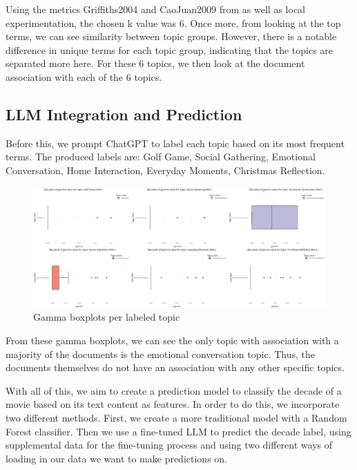 \documentclass[
  authoryear,
  preprint]{elsarticle}
\begin{document}
Using the metrics Griffiths2004 and CaoJuan2009 from \citet{ldatuning}
as well as local experimentation, the chosen k value was 6. Once more,
from looking at the top terms, we can see similarity between topic
groups. However, there is a notable difference in unique terms for each
topic group, indicating that the topics are separated more here. For
these 6 topics, we then look at the document association with each of
the 6 topics.

\subsection{LLM Integration and
Prediction}\label{llm-integration-and-prediction}

Before this, we prompt ChatGPT to label each topic based on its most
frequent terms. The produced labels are: Golf Game, Social Gathering,
Emotional Conversation, Home Interaction, Everyday Moments, Christmas
Reflection.

\begin{figure}[H]

{\centering \includegraphics{images/top_topics_combined.png}

}

\caption{Gamma boxplots per labeled topic}

\end{figure}%

From these gamma boxplots, we can see the only topic with association
with a majority of the documents is the emotional conversation topic.
Thus, the documents themselves do not have an association with any other
specific topics.

With all of this, we aim to create a prediction model to classify the
decade of a movie based on its text content as features. In order to do
this, we incorporate two different methods. First, we create a more
traditional model with a Random Forest classifier. Then we use a
fine-tuned LLM to predict the decade label, using supplemental data for
the fine-tuning process and using two different ways of loading in our
data we want to make predictions on.
\end{document}
